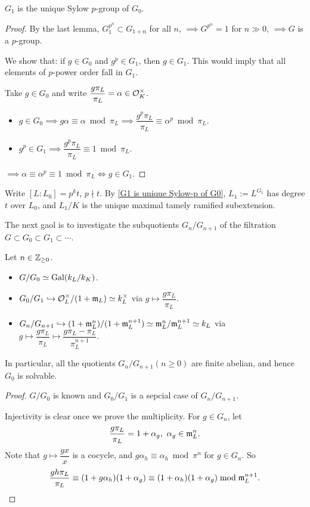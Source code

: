 \begin{proposition}\label{G1 is unique Sylow-p of G0}
    $G_1$ is the unique Sylow $p$-group of $G_0$.
\end{proposition}
\begin{proof}
    By the last lemma,
    $G_1^{p^n}\subset G_{1 + n}$ for all $n$,
    $\implies G^{p^n} = 1$ for $n\gg 0$,
    $\implies G$ is a $p$-group.

    We show that: if $g\in G_0$ and $g^p\in G_1$,
    then $g\in G_1$.
    This would imply that all elements of $p$-power order fall in $G_1$.

    Take $g\in G_0$ and write $\dfrac{g\pi_L}{\pi_L} = \alpha\in\mathcal{O}_K^\times$.
    \begin{itemize}
\item $g\in G_0\implies g\alpha\equiv\alpha\bmod\pi_L\implies \dfrac{g^p\pi_L}{\pi_L}\equiv \alpha^p\bmod\pi_L$.
\item $g^p\in G_1\implies \dfrac{g^p\pi_L}{\pi_L}\equiv 1\bmod\pi_L$.
    \end{itemize}
    $\implies \alpha\equiv \alpha^p \equiv 1\bmod\pi_L\iff g\in G_1$.
\end{proof}

Write $[L : L_0] = p^kt$, $p\nmid t$.
By \cref{G1 is unique Sylow-p of G0},
$L_1 := L^{G_1}$ has degree $t$ over $L_0$, and $L_1/K$ is the unique maximal tamely ramified subextension.

The next gaol is to investigate the subquotients $G_n/G_{n+1}$ of the filtration $G\subset G_0\subset G_1\subset\cdots$.

\begin{proposition}\label{subquotients of lower ramification filtration}
    Let $n\in \mathbb{Z}_{\ge 0}$.
\begin{itemize}
    \item $G/G_0\simeq\operatorname{Gal}(k_L/k_K)$.
    \item $G_0/G_1\hookrightarrow \mathcal{O}_L^\times/(1 + \mathfrak{m}_L)\simeq k_L^\times$ via $g\mapsto \dfrac{g\pi_L }{\pi_L } $.
    \item $G_n/G_{n+1}\hookrightarrow (1 + \mathfrak{m}_L^n)/(1 + \mathfrak{m}_L^{n+1})\simeq \mathfrak{m}_L^n/\mathfrak{m}_L^{n+1}\simeq k_L$ via $g\mapsto \dfrac{g\pi_L }{\pi_L } \mapsto \dfrac{g\pi_L - \pi_L}{\pi_L^{n+1}}$.
\end{itemize}
In particular, all the quotients $G_n/G_{n+1}(n\ge 0)$ are finite abelian, and hence $G_0$ is solvable.
\end{proposition}
\begin{proof}
    $G/G_0$ is known and $G_0/G_1$ is a sepcial case of $G_n/G_{n+1}$.

    Injectivity is clear once we prove the multiplicity.
    For $g\in G_n$, let \[\frac{g\pi_L}{\pi_L} = 1 + \alpha_g,\ \alpha_g\in\m_L^n.\]
    Note that $g\mapsto \dfrac{gx}{x}$ is a cocycle,
    and $g\alpha_h \equiv\alpha_h\bmod \pi^n$ for $g\in G_n$.
    So
    \[
    \dfrac{gh\pi_L}{\pi_L} \equiv (1 + g\alpha_h)(1 + \alpha_g)\equiv (1 + \alpha_h)(1 + \alpha_g)\bmod\mathfrak{m}_L^{n+1}.\qedhere
    \]
\end{proof}



